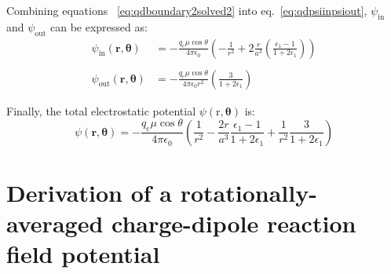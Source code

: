 \documentclass[11pt,oneside,a4paper]{article}
\begin{document}
Combining equations ~\ref{eq:qdboundary2solved2} into eq.~\ref{eq:qdpsiinpsiout}, $\psi_\mathrm{in}$ and $\psi_\mathrm{out}$ can be expressed as:
\begin{equation}
\label{eq:qdfinalpsi}
\begin{align} 
\psi_\mathrm{in}(\mathbf{r},\mathbf{\theta}) &= -\frac{q_\mathrm{c}\mu \cos\theta}{4\pi\epsilon_0}\left ( -\frac{1}{r^2} + 2 \frac{r}{a^3}\left ( \frac{\epsilon_1 -1}{1+2\epsilon_1} \right ) \right )  \\
\\
\psi_\mathrm{out}(\mathbf{r},\mathbf{\theta}) &= -\frac{q_\mathrm{c}\mu \cos\theta}{4\pi\epsilon_0 r^2} \left ( \frac{3}{1+2\epsilon_1} \right ) 
 \end{align}
\end{equation}

Finally, the total electrostatic potential $\psi(\mathrm{r},\mathbf{\theta})$ is:
\begin{equation}
\label{eq:rfpot}
 \psi(\mathbf{r},\mathbf{\theta}) = -\frac{q_\mathrm{c}\mu \cos\theta}{4\pi\epsilon_0}\left ( \frac{1}{r^2} -\frac{2r}{a^3}\frac{\epsilon_1 -1}{1 + 2\epsilon_1} + \frac{1}{r^2}\frac{3}{1 + 2\epsilon_1} \right )  
\end{equation} 


\section{Derivation of a rotationally-averaged charge-dipole reaction field potential}
\label{sec:rotavg}
\end{document}
